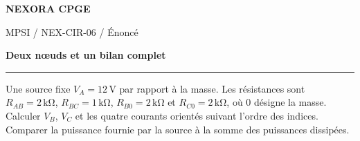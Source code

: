 \documentclass[11pt,a4paper]{article}
\begin{document}
{\small\bfseries\color{nexorablue} NEXORA CPGE}\par
{\small MPSI / NEX-CIR-06 / Énoncé}\par
{\LARGE\bfseries Deux nœuds et un bilan complet}\par
\vspace{0.25em}\hrule\vspace{0.6em}

Une source fixe $V_A=12\,\mathrm V$ par rapport à la masse. Les résistances sont $R_{AB}=2\,\mathrm{k\Omega}$, $R_{BC}=1\,\mathrm{k\Omega}$, $R_{B0}=2\,\mathrm{k\Omega}$ et $R_{C0}=2\,\mathrm{k\Omega}$, où $0$ désigne la masse. Calculer $V_B$, $V_C$ et les quatre courants orientés suivant l’ordre des indices. Comparer la puissance fournie par la source à la somme des puissances dissipées.
\end{document}
